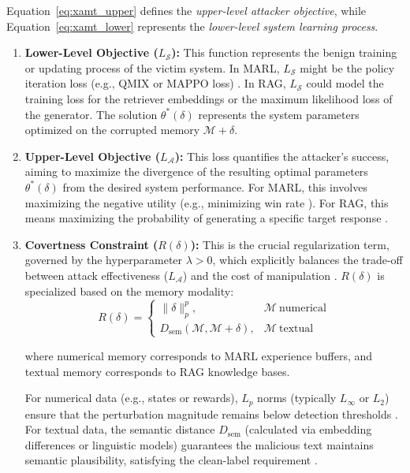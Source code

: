 \documentclass[conference]{IEEEtran}
\begin{document}
Equation~\eqref{eq:xamt_upper} defines the \emph{upper-level attacker objective}, while
Equation~\eqref{eq:xamt_lower} represents the \emph{lower-level system learning process}.


\begin{enumerate}
    \item \textbf{Lower-Level Objective ($L_{\mathcal{S}}$):} This function represents the benign training or updating process of the victim system. In MARL, $L_{\mathcal{S}}$ might be the policy iteration loss (e.g., QMIX or MAPPO loss) \cite{Ref6}. In RAG, $L_{\mathcal{S}}$ could model the training loss for the retriever embeddings or the maximum likelihood loss of the generator. The solution $\theta^*(\delta)$ represents the system parameters optimized on the corrupted memory $\mathcal{M} + \delta$.
    \item \textbf{Upper-Level Objective ($L_{\mathcal{A}}$):} This loss quantifies the attacker's success, aiming to maximize the divergence of the resulting optimal parameters $\theta^*(\delta)$ from the desired system performance. For MARL, this involves maximizing the negative utility (e.g., minimizing win rate \cite{Ref36}). For RAG, this means maximizing the probability of generating a specific target response \cite{Ref37}.
    \item \textbf{Covertness Constraint ($R(\delta)$):} This is the crucial regularization term, governed by the hyperparameter $\lambda > 0$, which explicitly balances the trade-off between attack effectiveness ($L_{\mathcal{A}}$) and the cost of manipulation \cite{Ref24}. $R(\delta)$ is specialized based on the memory modality:
  \begin{equation}
R(\delta) =
\begin{cases}
\|\delta\|_p^p, & \mathcal{M}\ \text{numerical} \\
D_{\text{sem}}(\mathcal{M}, \mathcal{M}+\delta), & \mathcal{M}\ \text{textual}
\end{cases}
\label{eq:covertness}
\end{equation}

where numerical memory corresponds to MARL experience buffers, and textual memory corresponds to RAG knowledge bases.

    For numerical data (e.g., states or rewards), $L_p$ norms (typically $L_\infty$ or $L_2$) ensure that the perturbation magnitude remains below detection thresholds \cite{Ref24}. For textual data, the semantic distance $D_{\text{sem}}$ (calculated via embedding differences or linguistic models) guarantees the malicious text maintains semantic plausibility, satisfying the clean-label requirement \cite{Ref29}.
\end{enumerate}
\end{document}
